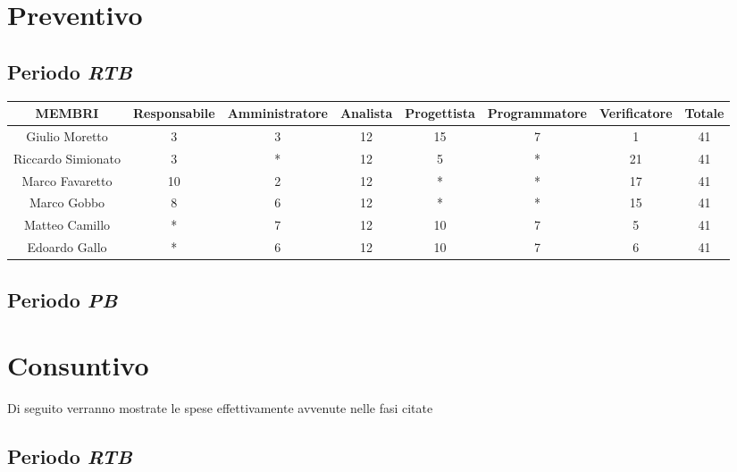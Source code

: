 \documentclass[5pt]{article}
\begin{document}
\section{Preventivo}
\subsection{Periodo \textit{RTB}}

\begin{tabular}{|c|c|c|c|c|c|c||c|}
  \hline
  \rowcolor{yellow!50}
  MEMBRI & Responsabile & Amministratore & Analista & Progettista &	Programmatore	& Verificatore & Totale \\ \hline \hline
  Giulio Moretto & 3 & 3 & 12	& 15 & 7 & 1 & 41 \\ \hline
  Riccardo Simionato & 3 & * & 12	& 5	& * & 21 & 41 \\ \hline
  Marco Favaretto & 10 & 2 & 12 & * & * & 17 & 41 \\ \hline
  Marco Gobbo & 8 & 6 & 12 & * & * & 15 & 41 \\ \hline
  Matteo Camillo & * & 7 & 12 & 10 & 7 & 5 & 41 \\ \hline
  Edoardo	Gallo & * & 6 & 12 & 10 & 7 & 6 & 41 \\ \hline
\end{tabular}

\subsection{Periodo \textit{PB}}
\begin{table}[ht]
  \centering
\end{table}

\section{Consuntivo}
Di seguito verranno mostrate le spese effettivamente avvenute nelle fasi citate
\subsection{Periodo \textit{RTB}}
\end{document}
